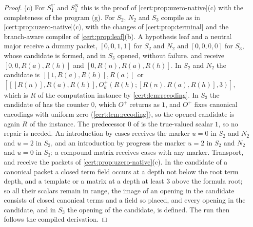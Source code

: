 \begin{proof}
(c) For $S^{\mathrm T}_1$ and $S^{\mathrm N}_1$ this is the proof of
\cref{cert:prop:uzero-native}(c) with the completeness of the program (g). For
$S_2$, $N_2$ and $S_3$ compile as in \cref{cert:prop:uzero-native}(c), with the
changes of \cref{cert:prop:terminal} and the branch-aware compiler of
\cref{cert:prop:leaf}(b). A hypothesis leaf and a neutral major receive a dummy
packet, $[0,0,1,1]$ for $S_2$ and $N_2$ and $[0,0,0,0]$ for $S_3$, whose
candidate is formed, and in $S_3$ opened, without failure.  and
 receive $[0,0,R(a),R(h)]$ and $[0,R(n),R(a),R(h)]$. In $S_2$ and $N_2$
the candidate is $[[1,R(a),R(h)],R(a)]$ or
$[[[R(n)],R(a),R(h)],O^{+}_k(R(h);[R(n),R(a),R(h)],3)]$, which is $R$ of the
computation instance by \cref{cert:lem:recoding}. In $S_3$ the candidate of
 has the counter $0$, which $O^{+}$ returns as $1$, and $O^{+}$ fixes
canonical encodings with uniform zero (\cref{cert:lem:recoding}), so the opened
candidate is again $R$ of the instance. The predecessor $0$ of  is
the true-valued scalar $1$, so no repair is needed. An introduction by cases
receives the marker $u=0$ in $S_2$ and $N_2$ and $u=2$ in $S_3$, and an
introduction by progress the marker $u=2$ in $S_2$ and $N_2$ and $u=0$ in $S_3$;
a compound matrix receives cases with any marker. Transport,  and
 receive the packets of \cref{cert:prop:uzero-native}(c). In the
candidate of a canonical packet a closed term field occurs at a depth not below
the root term depth, and a template or a matrix at a depth at least $3$ above
the formula root; so all their scalars remain in range, the image of an opening
in the candidate consists of closed canonical terms and a field so placed, and
every opening in the candidate, and in $S_3$ the opening of the candidate, is
defined. The run then follows the compiled derivation.
\end{proof}


